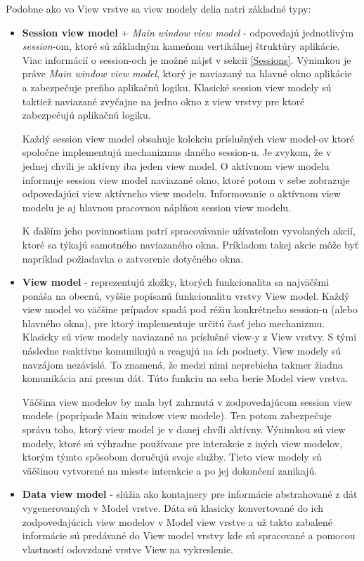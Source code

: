 Podobne ako vo View vrstve sa view modely delia natri základné typy:
\begin{itemize}
    \item \textbf{Session view model} + \textit{Main window view model} - odpovedajú jednotlivým \textit{session}-om, ktoré sú základným kameňom vertikálnej štruktúry aplikácie. Viac informácií o session-och je možné nájsť v sekcii \ref{Sessions}. Výnimkou je práve \textit{Main window view model}, ktorý je naviazaný na hlavné okno aplikácie a zabezpečuje preňho aplikačnú logiku. Klasické session view modely sú taktiež naviazané zvyčajne na jedno okno z view vrstvy pre ktoré zabezpečujú aplikačnú logiku.
    
    Každý session view model obsahuje kolekciu príslušných view model-ov ktoré spoločne implementujú mechanizmus daného session-u. Je zvykom, že v jednej chvíli je aktívny iba jeden view model. O aktívnom view modelu informuje session view model naviazané okno, ktoré potom v sebe zobrazuje odpovedajúci view aktívneho view modelu. Informovanie o aktívnom view modelu je aj hlavnou pracovnou náplňou session view modelu.

    K ďalším jeho povinnostiam patrí spracovávanie užívateľom vyvolaných akcií, ktoré sa týkajú samotného naviazaného okna. Príkladom takej akcie môže byť napríklad požiadavka o zatvorenie dotyčného okna.
    \item \textbf{View model} - reprezentujú zložky, ktorých funkcionalita sa najväčšmi ponáša na obecnú, vyššie popísanú funkcionalitu vrstvy View model. Každý view model vo väčšine prípadov spadá pod réžiu konkrétneho session-u (alebo hlavného okna), pre ktorý implementuje určitú časť jeho mechanizmu. Klasicky sú view modely naviazané na príslušné view-y z View vrstvy. S tými následne reaktívne komunikujú a reagujú na ích podnety. View modely sú navzájom nezávislé. To znamená, že medzi nimi neprebieha takmer žiadna komunikácia ani presun dát. Túto funkciu na seba berie Model view vrstva.

    Väčšina view modelov by mala byť zahrnutá v zodpovedajúcom session view modele (poprípade Main window view modele). Ten potom zabezpečuje správu toho, ktorý view model je v danej chvíli aktívny. Výnimkou sú view modely, ktoré sú výhradne používane pre interakcie z iných view modelov, ktorým týmto spôsobom doručujú svoje služby. Tieto view modely sú väčšinou vytvorené na mieste interakcie a po jej dokončení zanikajú.
    \item \textbf{Data view model} - slúžia ako kontajnery pre informácie abstrahované z dát vygenerovaných v Model vrstve. Dáta sú klasicky konvertované do ich zodpovedajúcich view modelov v Model view vrstve a už takto zabalené informácie sú predávané do View model vrstvy kde sú spracované a pomocou vlastností odovzdané vrstve View na vykreslenie. 
    

\end{itemize}
